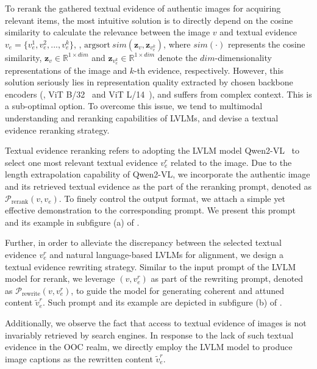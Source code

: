 To rerank the gathered textual evidence of authentic images for acquiring relevant items, the most intuitive solution is to directly depend on the cosine similarity to calculate the relevance between the image $v$ and textual evidence $v_e=\{v^1_e, v^2_e,...,v^k_e\}$, \ie, $\mathrm{argsort}\ sim(\mathbf{z}_v, \mathbf{z}_{v^k_e})$, where $sim(\cdot)$ represents the cosine similarity, $\mathbf{z}_v\in\mathbb{R}^{1\times dim}$ and $\mathbf{z}_{v^k_e}\in\mathbb{R}^{1\times dim}$ denote the $dim$-dimensionality representations of the image and $k$-th evidence, respectively. However, this solution seriously lies in representation quality extracted by chosen backbone encoders (\eg, ViT B/32~\cite{radford2021learning} and ViT L/14~\cite{li2023blip}), and suffers from complex context. This is a sub-optimal option. To overcome this issue, we tend to multimodal understanding and reranking capabilities of LVLMs, and devise a textual evidence reranking strategy.

Textual evidence reranking refers to adopting the LVLM model Qwen2-VL~\cite{wang2024qwen2} to select one most relevant textual evidence $v^r_e$ related to the image. Due to the length extrapolation capability of Qwen2-VL, we incorporate the authentic image and its retrieved textual evidence as the part of the reranking prompt, denoted as $\mathcal{P}_\mathrm{rerank}(v, v_e)$. To finely control the output format, we attach a simple yet effective demonstration to the corresponding prompt. We present this prompt and its example in subfigure (a) of .

Further, in order to alleviate the discrepancy between the selected textual evidence $v^r_e$ and natural language-based LVLMs for alignment, we design a textual evidence rewriting strategy. Similar to the input prompt of the LVLM model for rerank, we leverage $(v, v^r_e)$ as part of the rewriting prompt, denoted as $\mathcal{P}_\mathrm{rewrite}(v, v^r_e)$, to guide the model for generating coherent and attuned content $\widetilde{v}^r_e$. Such prompt and its example are depicted in subfigure (b) of .

Additionally, we observe the fact that access to textual evidence of images is not invariably retrieved by search engines. In response to the lack of such textual evidence in the OOC realm, we directly employ the LVLM model to produce image captions as the rewritten content $\widetilde{v}^r_e$.